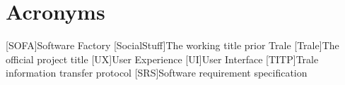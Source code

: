 \chapter{Acronyms}\label{ch:acronyms}
\begin{acronym}
    [SOFA]{Software Factory}
    [SocialStuff]{The working title prior Trale}
    [Trale]{The official project title}
    [UX]{User Experience}
    [UI]{User Interface}
    [TITP]{Trale information transfer protocol}
    [SRS]{Software requirement specification}
\end{acronym}
